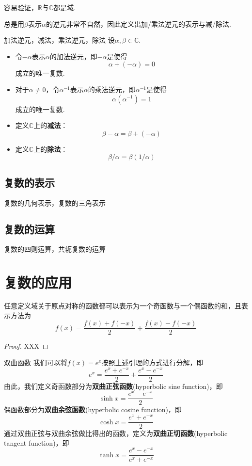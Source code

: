 \documentclass[lang=cn, zihao=5]{elegantbook}
\newcommand{\R}{\mathbb{R}}
\newcommand{\C}{\mathbb{C}}
\begin{document}
容易验证，$\R$与$\C$都是域.

总是用$\beta$表示$\alpha$的逆元非常不自然，因此定义出加/乘法逆元的表示与减/除法.

\begin{definition}{加法逆元，减法，乘法逆元，除法}
	设$\alpha , \beta \in \C $.
	\begin{itemize}
		\item 令$- \alpha$表示$\alpha$的加法逆元，即$-\alpha$是使得$$\alpha + (-\alpha) = 0$$成立的唯一复数.
		\item 对于$\alpha \neq 0$，令$\alpha ^{-1}$表示$\alpha$的乘法逆元，即$\alpha ^{-1}$是使得$$\alpha (\alpha ^{-1}) = 1$$成立的唯一复数.
		\item 定义$\C $上的\textbf{减法}：$$\beta - \alpha = \beta + (-\alpha)$$
		\item 定义$\C $上的\textbf{除法}：$$\beta / \alpha = \beta (1 / \alpha)$$
	\end{itemize}
\end{definition}

\subsection{复数的表示}

复数的几何表示，复数的三角表示

\subsection{复数的运算}

复数的四则运算，共轭复数的运算

\section{复数的应用}

\begin{lemma}
    任意定义域关于原点对称的函数都可以表示为一个奇函数与一个偶函数的和，且表示方法为$$f(x)=\frac{f(x)+f(-x)}{2}+\frac{f(x)-f(-x)}{2}$$
\end{lemma}
\begin{proof}
    XXX
\end{proof}

\begin{definition}{双曲函数}
    我们可以将$f(x)=e^x$按照上述引理的方式进行分解，即$$e^x=\frac{e^x+e^{-x}}{2}+\frac{e^x-e^{-x}}{2}$$
    由此，我们定义奇函数部分为\textbf{双曲正弦函数}(hyperbolic sine function)，即$$\sinh{x}=\frac{e^x-e^{-x}}{2}$$
    偶函数部分为\textbf{双曲余弦函数}(hyperbolic cosine function)，即$$\cosh{x}=\frac{e^x+e^{-x}}{2}$$
    通过双曲正弦与双曲余弦做比得出的函数，定义为\textbf{双曲正切函数}(hyperbolic tangent function)，即$$\tanh{x}=\frac{e^x-e^{-x}}{e^x+e^{-x}}$$
\end{definition}
\end{document}
